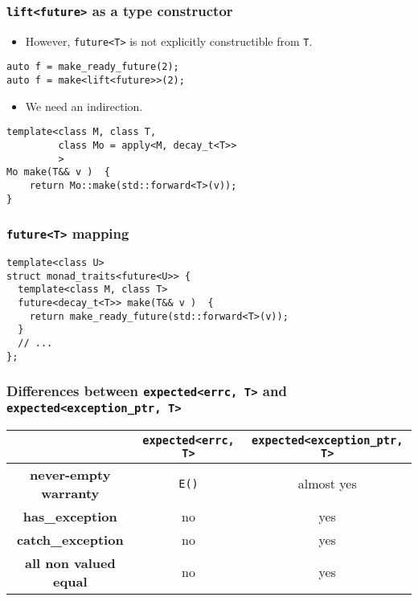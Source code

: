 \documentclass[xcolor=dvipsnames]{beamer}
\newcommand{\cpp}[1]{\lstinline{#1}}
\begin{document}
\begin{frame}[fragile]
\frametitle{\cpp{lift<future>} as a  type constructor}

\begin{itemize}
  \item However, \cpp{future<T>} is not explicitly constructible from \cpp{T}.
\end{itemize}

\begin{lstlisting}
auto f = make_ready_future(2); 
auto f = make<lift<future>>(2); 
\end{lstlisting}

\begin{itemize}
  \item We need an indirection.
\end{itemize}

\begin{lstlisting}
template<class M, class T, 
         class Mo = apply<M, decay_t<T>> 
         >
Mo make(T&& v )  {
    return Mo::make(std::forward<T>(v));
}
\end{lstlisting}

\end{frame}
\begin{frame}[fragile]
\frametitle{\cpp{future<T>} mapping}

\begin{lstlisting}
template<class U>
struct monad_traits<future<U>> { 
  template<class M, class T> 
  future<decay_t<T>> make(T&& v )  {
    return make_ready_future(std::forward<T>(v));
  }
  // ...
};
\end{lstlisting}

\end{frame}

\begin{frame}[fragile]
\frametitle{Differences between \cpp{expected<errc, T>} and \cpp{expected<exception_ptr, T>}}

\begin{tabular}{|c|c|c|}
\hline
                    & \cpp{expected<errc, T>} & \cpp{expected<exception_ptr, T>}  \\
\hline
\textbf{never-empty warranty} & \cpp{E()} & almost yes \\
\hline
\textbf{has\_exception} & no & yes \\
\hline
\textbf{catch\_exception} & no & yes \\
\hline
\textbf{all non valued equal} & no & yes \\
\hline
\end{tabular}
\end{frame}
\end{document}
